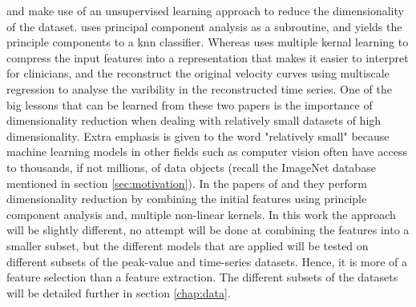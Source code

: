 \textcite{hf_diagnosis_ml} and \textcite{myocardial_motion_pattern} make use of an unsupervised learning approach to reduce the dimensionality of the dataset. \textcite{hf_diagnosis_ml} uses principal component analysis as a subroutine, and yields the principle components to a \acrshort{knn} classifier. Whereas \textcite{myocardial_motion_pattern} uses multiple kernal learning to compress the input features into a representation that makes it easier to interpret for clinicians, and the reconstruct the original velocity curves using multiscale regression to analyse the varibility in the reconstructed time series. One of the big lessons that can be learned from these two papers is the importance of dimensionality reduction when dealing with relatively small datasets of high dimensionality. Extra emphasis is given to the word "relatively small" because machine learning models in other fields such as computer vision often have access to thousands, if not millions, of data objects (recall the ImageNet database mentioned in section \ref{sec:motivation}). In the papers of \textcite{hf_diagnosis_ml} and \textcite{myocardial_motion_pattern} they perform dimensionality reduction by combining the initial features using principle component analysis and, multiple non-linear kernels. In this work the approach will be slightly different, no attempt will be done at combining the features into a smaller subset, but the different models that are applied will be tested on different subsets of the peak-value and time-series datasets. Hence, it is more of a feature selection than a feature extraction. The different subsets of the datasets will be detailed further in section \ref{chap:data}.